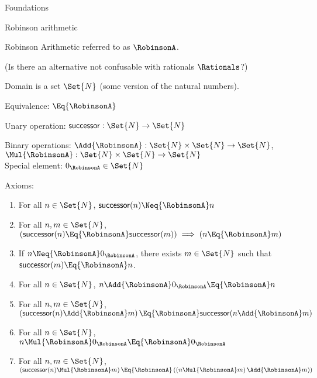 \documentclass[12pt]{PalisadesLakesBook}
\begin{document}
\begin{plSection}{Foundations}
\begin{plSection}{}
  \begin{plSection}{Robinson arithmetic~ \cite{wiki:RobinsonArithmetic}}

    Robinson Arithmetic referred to as $\RobinsonA$.

    (\TODO Is there an alternative not confusable with rationals $\Rationals$?)

    Domain is a set $\Set{N}$ (some version of the natural numbers).

    Equivalence: $\Eq{\RobinsonA}$

    Unary operation: $\mathsf{successor} : \Set{N} \rightarrow \Set{N}$

    Binary operations:
    $\Add{\RobinsonA} : \Set{N} \times \Set{N} \rightarrow \Set{N}$,
    $\Mul{\RobinsonA} : \Set{N} \times \Set{N} \rightarrow \Set{N}$\\

    Special element: $0_{\RobinsonA} \in \Set{N}$

    Axioms:
    \begin{enumerate}
      \item For all $n \in \Set{N}$,
      $\mathsf{successor}(n) \Neq{\RobinsonA} n$

      \item For all $n, m \in \Set{N}$,
      $\left( \mathsf{successor}(n) \Eq{\RobinsonA}
      \mathsf{successor}(m) \right)
      \implies \left( n \Eq{\RobinsonA} m \right)$

      \item If $n \Neq{\RobinsonA} 0_{\RobinsonA}$,
      there exists $m \in \Set{N}$ such that
      $\mathsf{successor}(m) \Eq{\RobinsonA} n$.

      \item For all $n \in \Set{N}$,
      $n \Add{\RobinsonA} 0_{\RobinsonA} \Eq{\RobinsonA} n$

      \item For all $n, m \in \Set{N}$,
      $\left( \mathsf{successor}(n) \Add{\RobinsonA} m \right)
      \Eq{\RobinsonA}
      \mathsf{successor}(n \Add{\RobinsonA} m)$

      \item For all $n \in \Set{N}$,
      $n \Mul{\RobinsonA} 0_{\RobinsonA} \Eq{\RobinsonA} 0_{\RobinsonA}$

      \item For all $n, m \in \Set{N}$,
      $\left( \mathsf{successor}(n) \Mul{\RobinsonA} m \right)
      \Eq{\RobinsonA}
      \left(
      \left( n \Mul{\RobinsonA} m \right)  \Add{\RobinsonA} m)
      \right)$


\end{enumerate}
\end{plSection}
\end{plSection}
\end{plSection}
\end{document}
